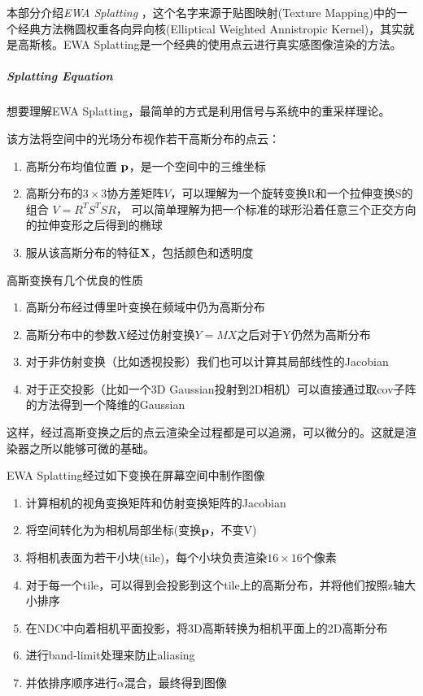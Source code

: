 本部分介绍\textit{EWA Splatting}\cite{zwickerEWAVolumeSplatting2001} \cite{zwickerEWASplatting2002} ，这个名字来源于贴图映射(Texture Mapping)中的一个经典方法椭圆权重各向异向核(Elliptical Weighted Annistropic Kernel)，其实就是高斯核。EWA Splatting是一个经典的使用点云进行真实感图像渲染的方法。

\subparagraph{Splatting Equation}

想要理解EWA Splatting，最简单的方式是利用信号与系统中的重采样理论。

该方法将空间中的光场分布视作若干高斯分布的点云：

\begin{enumerate}
    \item 高斯分布均值位置 $\bf{p}$，是一个空间中的三维坐标
    \item 高斯分布的$3\times 3$协方差矩阵$V$，可以理解为一个旋转变换R和一个拉伸变换S的组合 $V=R^TS^TSR$，
        可以简单理解为把一个标准的球形沿着任意三个正交方向的拉伸变形之后得到的椭球
    \item 服从该高斯分布的特征$\bf{X}$，包括颜色和透明度 
\end{enumerate}

高斯变换有几个优良的性质

\begin{enumerate}
    \item 高斯分布经过傅里叶变换在频域中仍为高斯分布
    \item 高斯分布中的参数$X$经过仿射变换$Y=MX$之后对于Y仍然为高斯分布
    \item 对于非仿射变换（比如透视投影）我们也可以计算其局部线性的Jacobian
    \item 对于正交投影（比如一个3D Gaussian投射到2D相机）可以直接通过取cov子阵的方法得到一个降维的Gaussian
\end{enumerate}

这样，经过高斯变换之后的点云渲染全过程都是可以追溯，可以微分的。这就是渲染器之所以能够可微的基础。

EWA Splatting经过如下变换在屏幕空间中制作图像

\begin{enumerate}
    \item 计算相机的视角变换矩阵和仿射变换矩阵的Jacobian
    \item 将空间转化为为相机局部坐标(变换$\bf{p}$，不变V)
    \item 将相机表面为若干小块(tile)，每个小块负责渲染$16\times 16$个像素
    \item 对于每一个tile，可以得到会投影到这个tile上的高斯分布，并将他们按照z轴大小排序
    \item 在NDC中向着相机平面投影，将3D高斯转换为相机平面上的2D高斯分布
    \item 进行band-limit处理来防止aliasing 
    \item 并依排序顺序进行$\alpha$混合，最终得到图像
\end{enumerate}